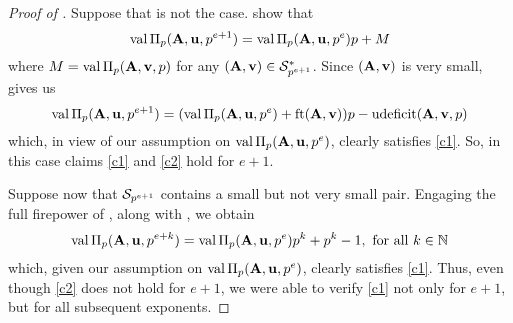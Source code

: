 \documentclass{amsart}
\begin{document}
\begin{proof}[Proof of ]
   Suppose that is not the case.
    show that
   \begin{equation}
      \label{recurrence: E}
      \val \IP_p(\matA,\vv{u},p^{e+1}) = \val \IP_p(\matA,\vv{u},p^e)p + M
   \end{equation}
   where $M = \val\IP_p(\matA,\vv{v},p)$ for any  $(\matA,\vv{v}) \in \S^*_{p^{e+1}}$.
   Since $(\matA,\vv{v})$ is very small,  gives us
   \[\val \IP_p(\matA,\vv{u},p^{e+1}) = (\val \IP_p(\matA,\vv{u},p^e) + \ft{\matA}{\vv{v}}) p - \udeficit(\matA,\vv{v},p)\]
   which, in view of our assumption on $\val \IP_p(\matA,\vv{u},p^e)$, clearly satisfies \ref{c1}.
   So, in this case claims \ref{c1} and \ref{c2} hold for $e+1$.

   Suppose now that $\S_{p^{e+1}}$ contains a small but not very small pair.
   Engaging the full firepower of , along with , we obtain
   \begin{equation}
      \label{tail: E}
      \val \IP_p(\matA,\vv{u},p^{e+k}) = \val \IP_p(\matA,\vv{u},p^e)p^k + p^k - 1,\text{ for all }k\in \NN
   \end{equation}
   which, given our assumption on $\val \IP_p(\matA,\vv{u},p^e)$, clearly satisfies \ref{c1}.
   Thus, even though \ref{c2} does not hold for $e+1$, we were able to verify \ref{c1} not only for $e+1$, but for all subsequent exponents.
\end{proof}
\end{document}
